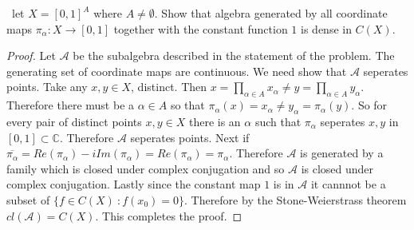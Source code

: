 \documentclass[11pt]{amsart}
\theoremstyle{definition}
\numberwithin{theorem}{section}
\numberwithin{definition}{section}
\numberwithin{equation}{section}
\def\scripta{{\mathcal A}}
\begin{document}
\medskip {}\ let $X = [0,1]^A$ where $A \neq \emptyset.$ Show that algebra generated by all coordinate maps $\pi_\alpha: X \to [0,1]$ together with the constant function $1$ is dense in $C(X).$
\begin{proof}
	Let $\scripta$ be the subalgebra described in the statement of the problem. The generating set of coordinate maps are continuous. We need show that $\scripta$ seperates points. Take any $x, y \in X$, distinct. Then $x = \prod_{\alpha \in A} x_\alpha \neq y = \prod_{\alpha \in A} y_\alpha$. Therefore there must be a $\alpha \in A$ so that $\pi_\alpha(x) = x_\alpha \neq y_\alpha = \pi_\alpha(y)$. So for every pair of distinct points $x,y \in X$ there is an $\alpha$ such that $\pi_\alpha$ seperates $x,y$ in $[0,1] \subset \mathbb{C}$. Therefore $\scripta$ seperates points. Next if $\overline{\pi_\alpha} = Re(\pi_\alpha) - iIm(\pi_\alpha) = Re(\pi_\alpha) = \pi_\alpha.$ Therefore $\scripta$ is generated by a family which is closed under complex conjugation and so  $\scripta$ is closed under complex conjugation. Lastly since the constant map $1$ is in $\scripta$ it cannnot be a subset of $\{f \in C(X)\ : f(x_0) = 0\}.$ Therefore by the Stone-Weierstrass theorem $cl(\scripta) = C(X).$ This completes the proof.
	\end{proof}
\end{document}
